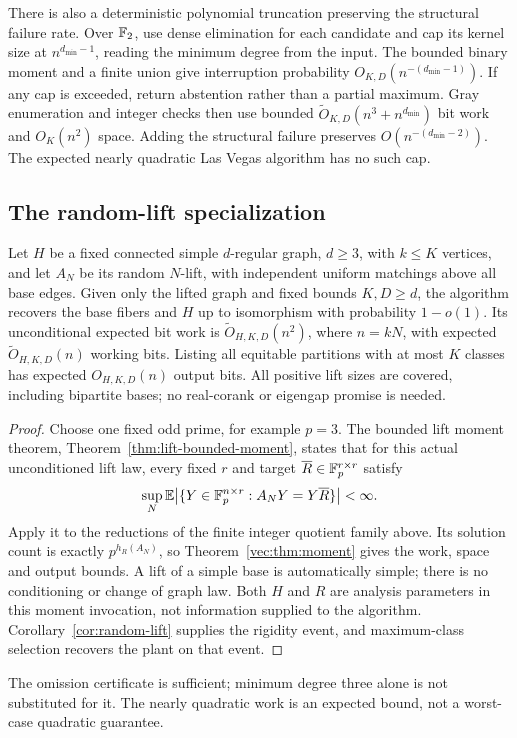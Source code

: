 There is also a deterministic polynomial truncation preserving the
structural failure rate. Over $\mathbb F_2$, use dense elimination for each
candidate and cap its kernel size at $n^{d_{\min}-1}$, reading the minimum degree from the input. The bounded binary moment and a finite union give
interruption probability $O_{K,D}(n^{-(d_{\min}-1)})$.
If any cap is exceeded, return abstention rather than a partial maximum.
Gray enumeration and
integer checks then use bounded
$\widetilde O_{K,D}(n^3+n^{d_{\min}})$ bit work and $O_K(n^2)$ space.
Adding the structural failure preserves $O(n^{-(d_{\min}-2)})$.
The expected nearly quadratic Las Vegas algorithm has no such cap.

\subsection{The random-lift specialization}
\begin{corollary}
\label{vec:cor:lift}
Let $H$ be a fixed connected simple $d$-regular graph, $d\ge3$,
with $k\le K$ vertices, and let $A_N$ be its random $N$-lift,
with independent uniform matchings above all base edges. Given only
the lifted graph and fixed bounds $K,D\ge d$, the algorithm recovers
the base fibers and $H$ up to isomorphism with probability $1-o(1)$.
Its unconditional expected bit work is
$\widetilde O_{H,K,D}(n^2)$, where $n=kN$, with expected
$\widetilde O_{H,K,D}(n)$ working bits. Listing all equitable
partitions with at most $K$ classes has expected $O_{H,K,D}(n)$
output bits. All positive lift sizes are covered, including bipartite
bases; no real-corank or eigengap promise is needed.
\end{corollary}
\begin{proof}
Choose one fixed odd prime, for example $p=3$. The bounded lift
moment theorem, Theorem~\ref{thm:lift-bounded-moment}, states that
for this actual unconditioned lift law, every fixed $r$ and target
$\overline R\in\mathbb F_p^{r\times r}$ satisfy
\[
 \sup_N\mathbb E\bigl|\{Y\in\mathbb F_p^{n\times r}:A_NY=Y\overline R\}\bigr|
 <\infty.
\]
Apply it to the reductions of the finite integer quotient family
above. Its solution count is exactly $p^{h_R(A_N)}$, so
Theorem~\ref{vec:thm:moment} gives the work, space and output bounds.
A lift of a simple base is automatically simple; there is no
conditioning or change of graph law. Both $H$ and $R$ are analysis
parameters in this moment invocation, not information supplied to
the algorithm. Corollary~\ref{cor:random-lift} supplies the rigidity
event, and maximum-class selection recovers the plant on that event.
\end{proof}

The omission certificate is sufficient; minimum degree three alone is
not substituted for it. The nearly quadratic work is an expected bound,
not a worst-case quadratic guarantee.
